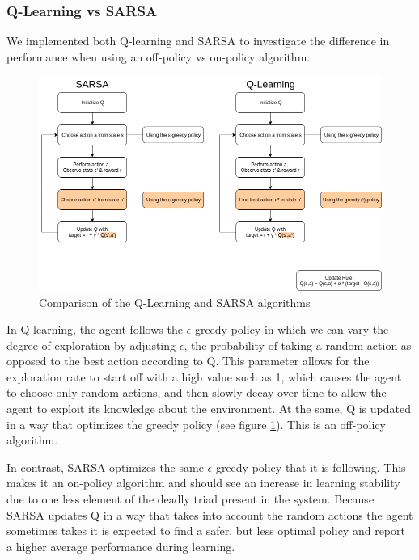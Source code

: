 \subsubsection{Q-Learning vs SARSA}\label{sec:ql_sarsa}
We implemented both Q-learning and SARSA to investigate the difference in performance when using an off-policy vs on-policy algorithm. 

\begin{figure}[h]
    \centering
    \includegraphics[width=1\linewidth]{img/SARSA_QL.png}
    \caption{Comparison of the Q-Learning and SARSA algorithms}
    \label{fig:ql_sarsa}
\end{figure}

In Q-learning, the agent follows the $\epsilon$-greedy policy in which we can vary the degree of exploration by adjusting $\epsilon$, the probability of taking a random action as opposed to the best action according to Q. This parameter allows for the exploration rate to start off with a high value such as 1, which causes the agent to choose only random actions, and then slowly decay over time to allow the agent to exploit its knowledge about the environment. At the same, Q is updated in a way that optimizes the greedy policy (see figure \ref{fig:ql_sarsa}). This is an off-policy algorithm.

In contrast, SARSA optimizes the same $\epsilon$-greedy policy that it is following. This makes it an on-policy algorithm and should see an increase in learning stability due to one less element of the deadly triad present in the system. Because SARSA updates Q in a way that takes into account the random actions the agent sometimes takes it is expected to find a safer, but less optimal policy \citep{sutton_barto_2018} and report a higher average performance during learning.



